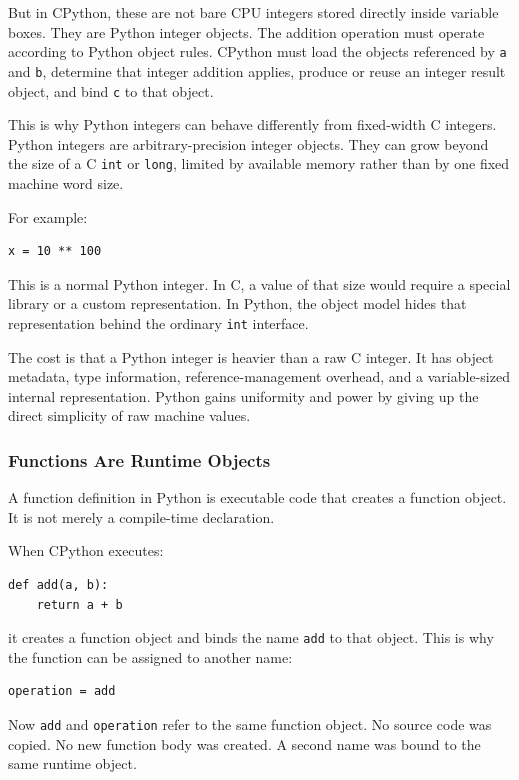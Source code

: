 But in CPython, these are not bare CPU integers stored directly inside variable boxes. They are Python integer objects. The addition operation must operate according to Python object rules. CPython must load the objects referenced by \texttt{a} and \texttt{b}, determine that integer addition applies, produce or reuse an integer result object, and bind \texttt{c} to that object.

This is why Python integers can behave differently from fixed-width C integers. Python integers are arbitrary-precision integer objects. They can grow beyond the size of a C \texttt{int} or \texttt{long}, limited by available memory rather than by one fixed machine word size.

For example:

\begin{verbatim}
x = 10 ** 100
\end{verbatim}

This is a normal Python integer. In C, a value of that size would require a special library or a custom representation. In Python, the object model hides that representation behind the ordinary \texttt{int} interface.

The cost is that a Python integer is heavier than a raw C integer. It has object metadata, type information, reference-management overhead, and a variable-sized internal representation. Python gains uniformity and power by giving up the direct simplicity of raw machine values.

\subsubsection*{Functions Are Runtime Objects}

A function definition in Python is executable code that creates a function object. It is not merely a compile-time declaration.

When CPython executes:

\begin{verbatim}
def add(a, b):
    return a + b
\end{verbatim}

it creates a function object and binds the name \texttt{add} to that object. This is why the function can be assigned to another name:

\begin{verbatim}
operation = add
\end{verbatim}

Now \texttt{add} and \texttt{operation} refer to the same function object. No source code was copied. No new function body was created. A second name was bound to the same runtime object.

